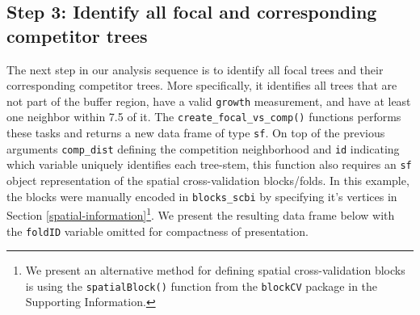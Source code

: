 \documentclass[12pt]{article}
\newenvironment{Shaded}{\begin{snugshade}}{\end{snugshade}}
\newcommand{\CommentTok}[1]{\textcolor[rgb]{0.56,0.35,0.01}{\textit{#1}}}
\newcommand{\DataTypeTok}[1]{\textcolor[rgb]{0.13,0.29,0.53}{#1}}
\newcommand{\KeywordTok}[1]{\textcolor[rgb]{0.13,0.29,0.53}{\textbf{#1}}}
\newcommand{\NormalTok}[1]{#1}
\newcommand{\OperatorTok}[1]{\textcolor[rgb]{0.81,0.36,0.00}{\textbf{#1}}}
\newcommand{\StringTok}[1]{\textcolor[rgb]{0.31,0.60,0.02}{#1}}
\begin{document}
\hypertarget{focal-vs-comp}{%
\subsection{Step 3: Identify all focal and corresponding competitor
trees}\label{focal-vs-comp}}

The next step in our analysis sequence is to identify all focal trees
and their corresponding competitor trees. More specifically, it
identifies all trees that are not part of the buffer region, have a
valid \texttt{growth} measurement, and have at least one neighbor within
7.5 of it. The \texttt{create\_focal\_vs\_comp()} functions performs
these tasks and returns a new data frame of type \texttt{sf}. On top of
the previous arguments \texttt{comp\_dist} defining the competition
neighborhood and \texttt{id} indicating which variable uniquely
identifies each tree-stem, this function also requires an \texttt{sf}
object representation of the spatial cross-validation blocks/folds. In
this example, the blocks were manually encoded in \texttt{blocks\_scbi}
by specifying it's vertices in Section
\ref{spatial-information}\footnote{We present an alternative method for
  defining spatial cross-validation blocks is using the
  \texttt{spatialBlock()} function from the \texttt{blockCV} package in
  the Supporting Information.}. We present the resulting data frame
below with the \texttt{foldID} variable omitted for compactness of
presentation.

\begin{Shaded}
\end{Shaded}
\end{document}
